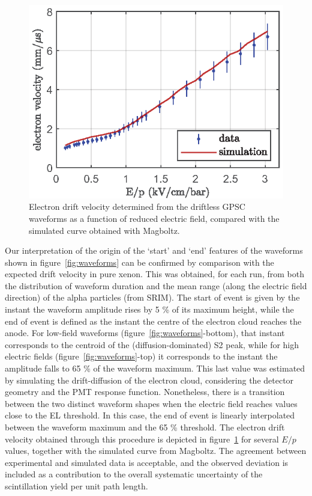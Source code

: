 \documentclass[%
 reprint,
superscriptaddress,
 amsmath,amssymb,
 aps,
]{revtex4-2}
\begin{document}
\begin{figure}[tbp]
\centering %
\includegraphics[scale=0.9]{Fig8.eps}
\hfill
\caption{\label{fig:vd}Electron drift velocity determined from the driftless GPSC waveforms as a function of reduced electric field, compared with the simulated curve obtained with Magboltz.}
\end{figure}

Our interpretation of the origin of the `start' and `end' features of the waveforms shown in figure~\ref{fig:waveforms} can be confirmed by comparison with the expected drift velocity in pure xenon. This was obtained, for each run, from both the distribution of waveform duration and the mean range (along the electric field direction) of the alpha particles (from SRIM). The start of event is given by the instant the waveform amplitude rises by 5 \% of its maximum height, while the end of event is defined as the instant the centre of the electron cloud reaches the anode. For low-field waveforms (figure~\ref{fig:waveforms}-bottom), that instant corresponds to the centroid of the (diffusion-dominated) S2 peak, while for high electric fields (figure~\ref{fig:waveforms}-top) it corresponds to the instant the amplitude falls to 65 \% of the waveform maximum. This last value was estimated by simulating the drift-diffusion of the electron cloud, considering the detector geometry and the PMT response function. Nonetheless, there is a transition between the two distinct waveform shapes when the electric field reaches values close to the EL threshold. In this case, the end of event is linearly interpolated between the waveform maximum and the 65 \% threshold. The electron drift velocity obtained through this procedure is depicted in figure~\ref{fig:vd} for several $E/p$ values, together with the simulated curve from Magboltz. The agreement between experimental and simulated data is acceptable, and the observed deviation is included as a contribution to the overall systematic uncertainty of the scintillation yield per unit path length.   
\end{document}
